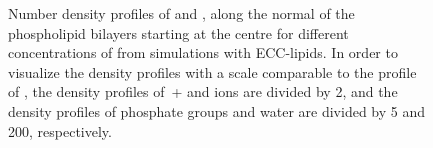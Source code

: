 \documentclass[12pt,a4paper,twoside,openright]{report}
\begin{document}
\begin{figure}[tb]
  \caption{ 
    Number density profiles of  and ,  along the normal of the phospholipid bilayers starting at the centre 
    for different concentrations of  from simulations with ECC-lipids. 
    In order to visualize the density profiles with a scale comparable to the profile of ,  
    the density profiles of~+ and  ions are divided by 2, and 
    the density profiles of phosphate groups and water are divided by 5 and 200, respectively.  
    } 
\end{figure} 
\end{document}

